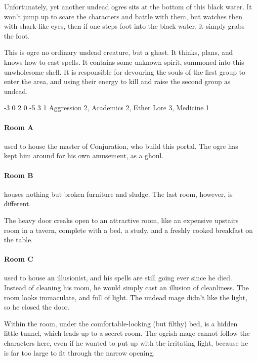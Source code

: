 \begin{multicols}{2}
Unfortunately, yet another undead ogres sits at the bottom of this black water.  It won't jump up to scare the characters and battle with them, but watches then with shark-like eyes, then if one steps foot into the black water, it simply grabs the foot.

This is ogre no ordinary undead creature, but a ghast.
It thinks, plans, and knows how to cast spells.
It contains some unknown spirit, summoned into this unwholesome shell.
It is responsible for devouring the souls of the first group to enter the area, and using their energy to kill and raise the second group as undead.

\label{undead_ogre}

	{-3}%
	{0}%
	{{2}%
	{0}%
	{-5}}%
	{3}%
	{1}%
	{Aggression 2, Academics 2, Ether Lore 3, Medicine 1}%
	{\longsword}%
	{\addtocounter{xpbonus}{3}}

\paragraph{Room A} used to house the master of Conjuration, who build this portal.
The ogre has kept him around for his own amusement, as a ghoul.

\paragraph{Room B} houses nothing but broken furniture and sludge.  The last room, however, is different.

\begin{boxtext}
	The heavy door creaks open to an attractive room, like an expensive upstairs room in a tavern, complete with a bed, a study, and a freshly cooked breakfast on the table.
\end{boxtext}

\paragraph{Room C} used to house an illusionist, and his spells are still going ever since he died.  Instead of cleaning his room, he would simply cast an illusion of cleanliness.  The room looks immaculate, and full of light.  The undead mage didn't like the light, so he closed the door.

Within the room, under the comfortable-looking (but filthy) bed, is a hidden little tunnel, which leads up to a secret room.
The ogrish mage cannot follow the characters here, even if he wanted to put up with the irritating light, because he is far too large to fit through the narrow opening.


\end{multicols}
